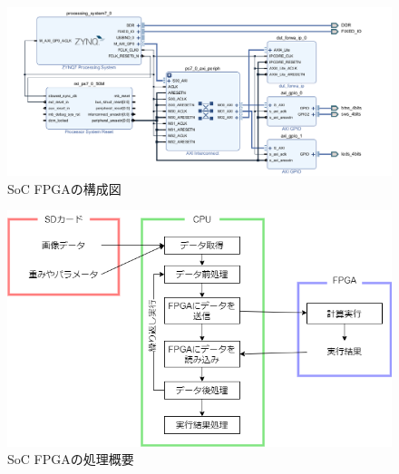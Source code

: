 \documentclass[paper]{ieicej}
\begin{document}
\begin{figure}[tb]
  \begin{center}
    \includegraphics[width=0.98\columnwidth]{figures/SoC_1.png}
  \end{center}
  \caption{SoC FPGAの構成図}
  \label{fig:2-2-4-1}
\end{figure}

\begin{figure}[tb]
  \begin{center}
    \includegraphics[width=0.98\columnwidth]{figures/SoC_2.png}
  \end{center}
  \caption{SoC FPGAの処理概要}
  \label{fig:2-2-4-2}
\end{figure}
\end{document}
